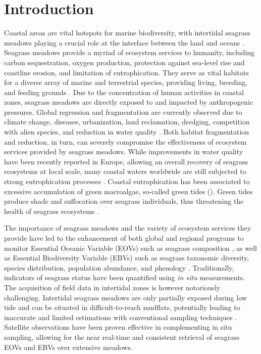 \documentclass[
  number]{elsarticle}
\begin{document}
\section{Introduction}\label{introduction}

Coastal areas are vital hotspots for marine biodiversity, with
intertidal seagrass meadows playing a crucial role at the interface
between the land and oceans \citep{unsworth2022}. Seagrass meadows
provide a myriad of ecosystem services to humanity, including carbon
sequestration, oxygen production, protection against sea-level rise and
coastline erosion, and limitation of eutrophication. They serve as vital
habitats for a diverse array of marine and terrestrial species,
providing living, breeding, and feeding grounds \citetext{\citealp[
]{gardner2018}; \citealp[ ]{Zoffoli2022}; \citealp{jankowska2019}}. Due
to the concentration of human activities in coastal zones, seagrass
meadows are directly exposed to and impacted by anthropogenic pressures.
Global regression and fragmentation are currently observed due to
climate change, diseases, urbanization, land reclamation, dredging,
competition with alien species, and reduction in water quality
\citetext{\citealp[ ]{nguyen2021}; \citealp[ ]{soissons2018}; \citealp[
]{orth2006}; \citealp[ ]{lin2018}; \citealp[ ]{duffy2019}; \citealp[
]{rasheed2011long}; \citealp{chefaoui2018dramatic}}. Both habitat
fragmentation and reduction, in turn, can severely compromise the
effectiveness of ecosystem services provided by seagrass meadows. While
improvements in water quality have been recently reported in Europe,
allowing an overall recovery of seagrass ecosystems at local scale, many
coastal waters worldwide are still subjected to strong eutrophication
processes \citetext{\citealp[ ]{deSantos2019}; \citealp{Zoffoli2021}}.
Coastal eutrophication has been associated to excessive accumulation of
green macroalgae, so-called green tides (\citep{devlin2023nutrients}).
Green tides produce shade and suffocation over seagrass individuals,
thus threatening the health of seagrass ecosystems \citep{wang2022}.

The importance of seagrass meadows and the variety of ecosystem services
they provide have led to the enhancement of both global and regional
programs to monitor Essential Oceanic Variable (EOVs) such as seagrass
composition \citep{Miloslavich2018}, as well as Essential Biodiversity
Variable (EBVs) such as seagrass taxonomic diversity, species
distribution, population abundance, and phenology \citep{Pereira2013}.
Traditionally, indicators of seagrass status have been quantified using
\emph{in situ} measurements. The acquisition of field data in intertidal
zones is however notoriously challenging. Intertidal seagrass meadows
are only partially exposed during low tide and can be situated in
difficult-to-reach mudflats, potentially leading to inaccurate and
limited estimations with conventional sampling techniques
\citep{nijland2019}. Satellite observations have been proven effective
in complementing in situ sampling, allowing for the near real-time and
consistent retrieval of seagrass EOVs and EBVs over extensive meadows.
\citetext{\citealp[ ]{Zoffoli2021}; \citealp[ ]{xu2021}; \citealp[
]{Traganos2018}; \citealp{coffer2023}}
\end{document}
